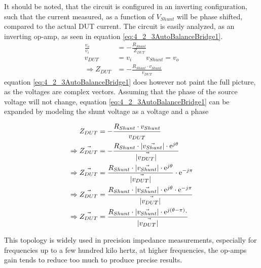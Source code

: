 It should be noted, that the circuit is configured in an inverting configuration, such that the current measured, as a function of $V_{Shunt}$ will be  phase shifted, compared to the actual DUT current. The circuit is easily analyzed, as an inverting op-amp, as seen in equation \ref{eq:4_2_3AutoBalanceBridge1}.
\begin{equation}
    \label{eq:4_2_3AutoBalanceBridge1}
    \begin{split}
        \frac{v_o}{v_i} &= -\frac{R_{Shunt}}{Z_{DUT}}\\
        v_{DUT} &= v_i \qquad v_{Shunt} = v_o \\
        \Rightarrow Z_{DUT} &= -\frac{R_{Shunt}\cdot v_{Shunt}}{v_{DUT}}
    \end{split}
\end{equation}
equation \ref{eq:4_2_3AutoBalanceBridge1} does however not paint the full picture, as the voltages are complex vectors. Assuming that the phase of the source voltage will not change, equation \ref{eq:4_2_3AutoBalanceBridge1} can be expanded by modeling 
the shunt voltage as a voltage and a phase

\begin{equation}
    \label{eq:4_2_3AutoBalanceBridge2}
    \begin{split}
        Z_{DUT} &= -\frac{R_{Shunt}\cdot v_{Shunt}}{v_{DUT}} \\
        \Rightarrow \vec{Z_{DUT}} &= -\frac{R_{Shunt}\cdot |\vec{v_{Shunt}}|\cdot\mathrm{e} ^{j\theta}}{|\vec{v_{DUT}|}} \\
        \Rightarrow \vec{Z_{DUT}} &= \frac{R_{Shunt}\cdot |\vec{v_{Shunt}}|\cdot\mathrm{e} ^{j\theta}}{|\vec{v_{DUT}|}} \cdot \mathrm{e} ^{-j\pi} \\
        \Rightarrow \vec{Z_{DUT}} &= \frac{R_{Shunt}\cdot |\vec{v_{Shunt}}|\cdot\mathrm{e} ^{j\theta}\cdot \mathrm{e} ^{-j\pi}}{|\vec{v_{DUT}|}}  \\
        \Rightarrow \vec{Z_{DUT}} &= \frac{R_{Shunt}\cdot |\vec{v_{Shunt}}|\cdot\mathrm{e} ^{j(\theta-\pi)}\cdot}{|\vec{v_{DUT}|}}
    \end{split}
\end{equation}

This topology is widely used in precision impedance measurements, especially for frequencies up to a few hundred kilo hertz, at higher frequencies, the op-amps gain tends to reduce too much to produce precise results.